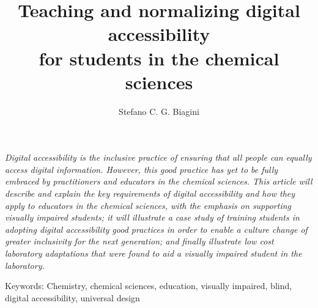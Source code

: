 \documentclass[11.5pt]{sig-alternate} %
\makeatletter
\let\oldabstract\abstract
\let\oldendabstract\endabstract
\renewenvironment{abstract} %
{\renewenvironment{quotation}%
               {\list{}{\addtolength{\leftmargin}{1em} %
                        \listparindent 1.5em%
                        \itemindent    \listparindent%
                        \rightmargin   \leftmargin%
                        \parsep        \z@ \@plus\p@}%
                \item\relax}%
               {\endlist}%
\oldabstract}
{\oldendabstract}
\makeatother
\begin{document}
\title{Teaching and normalizing digital accessibility \\ for students in the chemical sciences}

\author[1]{\large \color{blue} Stefano C. G. Biagini} %

\toappear{} %

\maketitle %
\begin{@twocolumnfalse} 
\begin{abstract}
\item %
\begin{large}
\textit{Digital accessibility is the inclusive practice of ensuring that all people can equally access digital information. However, this good practice has yet to be fully embraced by practitioners and educators in the chemical sciences. This article will describe and explain the key requirements of digital accessibility and how they apply to educators in the chemical sciences, with the emphasis on supporting visually impaired students; it will illustrate a case study of training students in adopting digital accessibility good practices in order to enable a culture change of greater inclusivity for the next generation; and finally illustrate low cost laboratory adaptations that were found to aid a visually impaired student in the laboratory.}
\item Keywords: Chemistry, chemical sciences, education, visually impaired, blind, digital accessibility, universal design

\end{large}     
\end{abstract}
\end{@twocolumnfalse}
\end{document}
